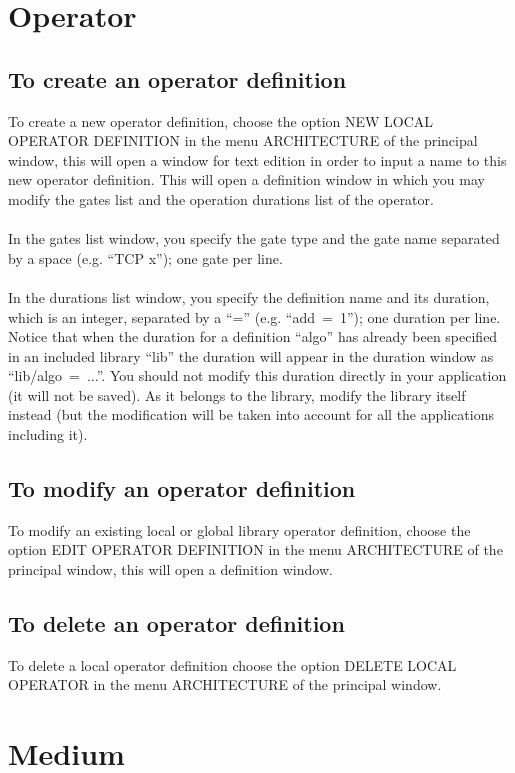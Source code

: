 \documentclass[11pt,twoside]{report}
\begin{document}
\section{Operator}
\subsection{To create an operator definition}
To create a new operator definition, choose the option NEW LOCAL
OPERATOR DEFINITION in the menu ARCHITECTURE of the principal window,
this will open a window for text edition in order to input a name to
this new operator definition. This will open a definition window in
which you may modify the gates list and the operation durations list
of the operator.\\\\
In the gates list window, you specify the gate type and the gate name
separated by a space (e.g. ``TCP x''); one gate per line.\\\\
In the durations list window, you specify the definition name and its
duration, which is an integer, separated by a ``='' (e.g.
``add~=~1''); one duration per line. Notice that when the duration for
a definition ``algo'' has already been specified in an included
library ``lib'' the duration will appear in the duration window as
``lib/algo~=~...''. You should not modify this duration directly in
your application (it will not be saved). As it belongs to the library,
modify the library itself instead (but the modification will be taken
into account for all the applications including it).

\subsection{To modify an operator definition}
To modify an existing local or global library operator definition,
choose the option EDIT OPERATOR DEFINITION in the menu ARCHITECTURE of
the principal window, this will open a definition window.

\subsection{To delete an operator definition}
To delete a local operator definition choose the option DELETE LOCAL OPERATOR in the menu ARCHITECTURE of the principal window.

\section{Medium}
\end{document}
